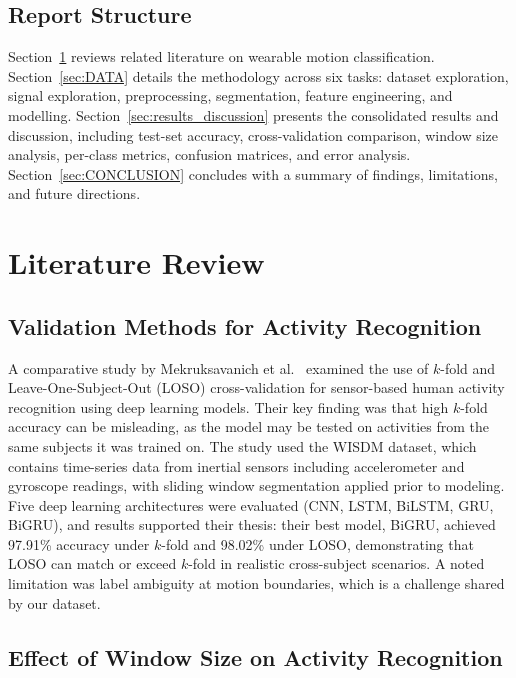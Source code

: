 \documentclass[12pt,a4paper]{cibb}
\begin{document}
\subsection{Report Structure}
Section~\ref{sec:litreview} reviews related literature on wearable motion classification. Section~\ref{sec:DATA} details the methodology across six tasks: dataset exploration, signal exploration, preprocessing, segmentation, feature engineering, and modelling. Section~\ref{sec:results_discussion} presents the consolidated results and discussion, including test-set accuracy, cross-validation comparison, window size analysis, per-class metrics, confusion matrices, and error analysis. Section~\ref{sec:CONCLUSION} concludes with a summary of findings, limitations, and future directions.




\section{Literature Review}
\label{sec:litreview}

\subsection{Validation Methods for Activity Recognition}

A comparative study by Mekruksavanich et al.~\cite{10962074} examined 
the use of $k$-fold and Leave-One-Subject-Out (LOSO) cross-validation 
for sensor-based human activity recognition using deep learning models. 
Their key finding was that high $k$-fold accuracy can be misleading, as 
the model may be tested on activities from the same subjects it was 
trained on. The study used the WISDM dataset, which contains time-series 
data from inertial sensors including accelerometer and gyroscope readings, 
with sliding window segmentation applied prior to modeling. Five deep 
learning architectures were evaluated (CNN, LSTM, BiLSTM, GRU, BiGRU), 
and results supported their thesis: their best model, BiGRU, achieved 
97.91\% accuracy under $k$-fold and 98.02\% under LOSO, demonstrating 
that LOSO can match or exceed $k$-fold in realistic cross-subject 
scenarios. A noted limitation was label ambiguity at motion boundaries, 
which is a challenge shared by our dataset.

\subsection{Effect of Window Size on Activity Recognition}
\end{document}
